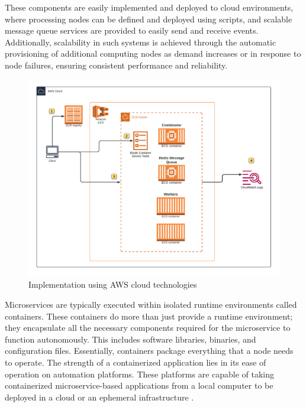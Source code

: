 \documentclass{cys}
\begin{document}
These components are easily implemented and deployed to cloud environments, where
processing nodes can be defined and deployed using scripts, and scalable message 
queue services are provided to easily send and receive events. Additionally, 
scalability in such systems is achieved through the automatic provisioning of 
additional computing nodes as demand increases or in response to node failures, 
ensuring consistent performance and reliability.

\begin{figure}[ht]
\centering
\includegraphics[width=\textwidth]{aws-deployment}
\caption{Implementation using AWS cloud technologies}
\label{fig:aws-deployment}
\end{figure}

Microservices are typically executed within isolated runtime environments called
containers. These containers do more than just provide a runtime environment; 
they encapsulate all the necessary components required for the microservice to 
function autonomously. 
This includes software libraries, binaries, and configuration files. Essentially, 
containers package everything that a node needs to operate.
The strength of a containerized application lies in its ease of operation on automation platforms. 
These platforms are capable of taking containerized microservice-based
applications from a local computer to be deployed in a cloud or an ephemeral 
infrastructure \cite{gilbert2018cloud,kratzke2017understanding}. 
\end{document}
